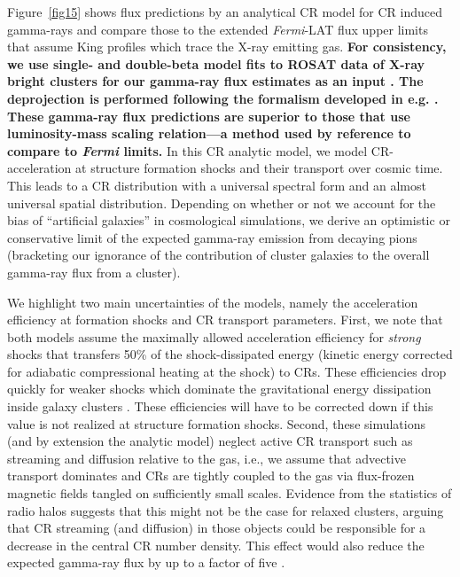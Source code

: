 \documentclass[10pt,aps,pra,reprint,amsmath,amsfonts,amssymb,showpacs,nofootinbib,floatfix]{revtex4-1}
\def\C#1{{\bf #1}}
\newcommand{\Fermi}{{\em Fermi}\xspace}
\begin{document}
Figure~\ref{fig15} shows flux predictions by an analytical CR model
\cite{2010MNRAS.409..449P} for CR induced gamma-rays and compare those
to the extended \Fermi-LAT flux upper limits that assume King profiles
which trace the X-ray emitting gas. \C{For consistency, we use single-
  and double-beta model fits to ROSAT data of X-ray bright clusters
  for our gamma-ray flux estimates as an input
  \cite{2007A&A...466..805C}. The deprojection is performed following
  the formalism developed in e.g. \cite{2004A&A...413...17P}. These
  gamma-ray flux predictions are superior to those that use
  luminosity-mass scaling relation---a method used by reference
  \cite{2010ApJ...717L..71A} to compare to \Fermi limits.}  In this CR
analytic model, we model CR-acceleration at structure formation shocks
and their transport over cosmic time. This leads to a CR distribution
with a universal spectral form and an almost universal spatial
distribution. Depending on whether or not we account for the bias of
``artificial galaxies'' in cosmological simulations, we derive an
optimistic or conservative limit of the expected gamma-ray emission
from decaying pions (bracketing our ignorance of the contribution of
cluster galaxies to the overall gamma-ray flux from a cluster).

We highlight two main uncertainties of the models, namely the
acceleration efficiency at formation shocks and CR transport
parameters. First, we note that both models assume the maximally
allowed acceleration efficiency for {\em strong} shocks that transfers
50\% of the shock-dissipated energy (kinetic energy corrected for
adiabatic compressional heating at the shock) to CRs. These
efficiencies drop quickly for weaker shocks \cite{2007A&A...473...41E}
which dominate the gravitational energy dissipation inside galaxy
clusters \cite{2006MNRAS.367..113P}. These efficiencies will have to
be corrected down if this value is not realized at structure formation
shocks. Second, these simulations (and by extension the analytic
model) neglect active CR transport such as streaming and diffusion
relative to the gas, i.e., we assume that advective transport
dominates and CRs are tightly coupled to the gas via flux-frozen
magnetic fields tangled on sufficiently small scales. Evidence from
the statistics of radio halos suggests that this might not be the case
for relaxed clusters, arguing that CR streaming (and diffusion) in
those objects could be responsible for a decrease in the central CR
number density. This effect would also reduce the expected gamma-ray
flux by up to a factor of five \cite{2011A&A...527A..99E}.
\end{document}
